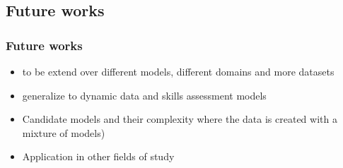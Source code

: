 \documentclass{beamer}
\begin{document}


\subsection{Future works}
\begin{frame}\frametitle{Future works}
\begin{itemize}
\item to be extend over different models, different domains and more datasets \pause
\item generalize to dynamic data and skills assessment models \pause
\item Candidate models and their complexity where the data is created with a mixture of models) \pause
\item Application in other fields of study  
\end{itemize}
\end{frame}
\end{document}
